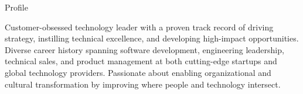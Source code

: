 \documentclass{resume} %
\begin{document}
\begin{rSection}{Profile}

    Customer-obsessed technology leader with a proven track record of driving strategy, instilling technical excellence, and developing high-impact opportunities. Diverse career history spanning software development, engineering leadership, technical sales, and product management at both cutting-edge startups and global technology providers. Passionate about enabling organizational and cultural transformation by improving where people and technology intersect.

    
\end{rSection}
    
\end{document}
